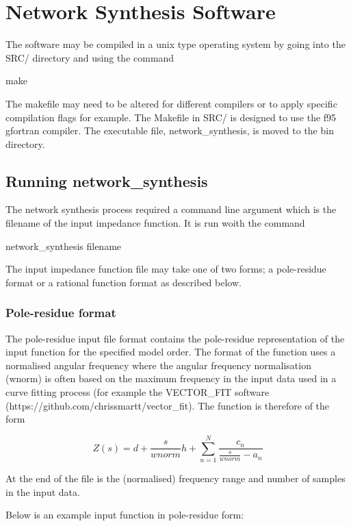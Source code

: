 \section{Network Synthesis Software} \label{software}

The software may be compiled in a unix type operating system by going into the SRC/ directory and using the command

make

The makefile may need to be altered for different compilers or to apply specific compilation flags for example. The Makefile in SRC/ is designed to use the f95 gfortran compiler. The executable file, network\_synthesis, is moved to the bin directory.

\subsection{Running network\_synthesis}

The network synthesis process required a command line argument which is the filename of the input impedance function. It is run woith the command

network\_synthesis filename

The input impedance function file may take one of two forms; a pole-residue format or a rational function format as described below.

\subsubsection{Pole-residue format}

The pole-residue input file format contains the pole-residue representation of the input function for the specified model order.
The format of the function uses a normalised angular frequency where the angular frequency normalisation (wnorm) is often based on the
maximum frequency in the input data used in a curve fitting process (for example the VECTOR\_FIT software (https://github.com/chrissmartt/vector\_fit). The function is therefore of the form

\begin{equation}\label{eq:pr1}
Z \left( s \right) = d+\frac{s}{wnorm} h+\sum_{n=1}^N \frac{c_n}{\frac{s}{wnorm}-a_n} 
\end{equation} 

At the end of the file is the (normalised) frequency range and number of samples in the input data.

Below is an example input function in pole-residue form:

